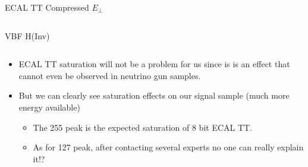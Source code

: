 \documentclass[8pt]{beamer}
\begin{document}
\begin{frame}{ECAL TT Compressed $E_{\perp}$}
\begin{columns}
\begin{block}{VBF H(Inv)}
\end{block}

\end{columns}

\begin{tiny}

\begin{itemize}
  \item ECAL TT saturation will not be a problem for us since is is an effect that cannot even be observed in neutrino gun samples.
  \item But we can clearly see saturation effects on our signal sample (much more energy available)
  \begin{itemize}
    \tiny
    \item The 255 peak is the expected saturation of 8 bit ECAL TT.
    \item As for 127 peak, after contacting several experts no one can really explain it!? 
  \end{itemize}
\end{itemize}

\end{tiny}

\end{frame}
\end{document}

